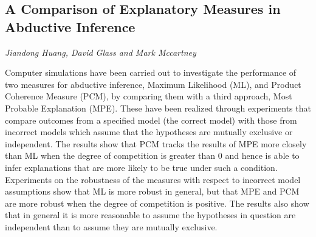 \documentclass[../booklet.tex]{subfiles}
\begin{document}
\subsection[A Comparison of Explanatory Measures in Abductive Inference. {\it Jiandong Huang, David Glass and Mark Mccartney}]{A Comparison of Explanatory Measures in Abductive Inference}
  

\begin{center}
  {\it Jiandong Huang, David Glass and Mark Mccartney}
\end{center}


Computer simulations have been carried out to investigate the performance of two measures for abductive inference, Maximum Likelihood (ML), and Product Coherence Measure (PCM), by comparing them with a third approach, Most Probable Explanation (MPE). These have been realized through experiments that compare outcomes from a specified model (the correct model) with those from incorrect models which assume that the hypotheses are mutually exclusive or independent. The results show that PCM tracks the results of MPE more closely than ML when the degree of competition is greater than 0 and hence is able to infer explanations that are more likely to be true under such a condition. Experiments on the robustness of the measures with respect to incorrect model assumptions show that ML is more robust in general, but that MPE and PCM are more robust when the degree of competition is positive.  The results also show that in general it is more reasonable to assume the hypotheses in question are independent than to assume they are mutually exclusive. 

\end{document}
